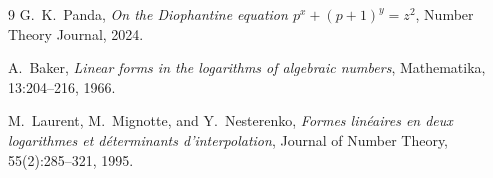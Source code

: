 \documentclass[11pt,a4paper]{article}
\begin{document}
\begin{thebibliography}{9}
G.~K.~Panda,
\emph{On the Diophantine equation $p^x + (p+1)^y = z^2$},
Number Theory Journal, 2024.

A.~Baker,
\emph{Linear forms in the logarithms of algebraic numbers},
Mathematika, 13:204--216, 1966.

M.~Laurent, M.~Mignotte, and Y.~Nesterenko,
\emph{Formes lin\'eaires en deux logarithmes et d\'eterminants d'interpolation},
Journal of Number Theory, 55(2):285--321, 1995.
\end{thebibliography}
\end{document}
